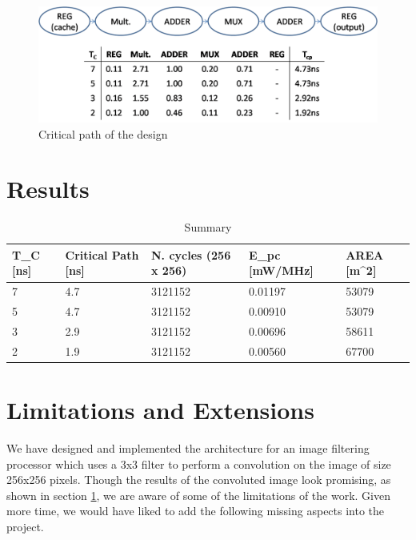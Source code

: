 \documentclass[11pt,a4paper]{article}
\begin{document}
\begin{figure}[h]
	\centering
		\includegraphics[width=6in]{./images/criticalpath.PNG}
	\caption{Critical path of the design}	\label{fig:critical}
\end{figure}

\FloatBarrier
\section{Results}
\label{sec:results}

\begin{table}[h]
	\caption{Summary}
	\begin{center}
		\begin{tabular}{|p{1cm}|p{2cm}|p{2cm}|l|l|} \hline
			\textbf{T}_C [ns] & \textbf{Critical Path} [ns] & \textbf{N. cycles} (256 x 256) & \textbf{E}_{pc} [mW/MHz] & \textbf{AREA} [\mu m^2] \\ \hline
			7 & 4.7 & 3121152 & 0.01197 & 53079 \\ \hline
			5 & 4.7 & 3121152 & 0.00910 & 53079 \\ \hline
			3 & 2.9 & 3121152 & 0.00696 & 58611 \\ \hline
			2 & 1.9 & 3121152 & 0.00560 & 67700 \\ \hline
		
		\end{tabular}
	\end{center}
	\label{tab:conclusion}
\end{table}


\section{Limitations and Extensions}
\label{sec:limitations}

We have designed and implemented the architecture for an image filtering processor which uses a 3x3 filter to perform a convolution on the image of size 256x256 pixels. Though the results of the convoluted image look promising, as shown in section \ref{sec:results}, we are aware of some of the limitations of the work. Given more time, we would have liked to add the following missing aspects into the project.
\end{document}
